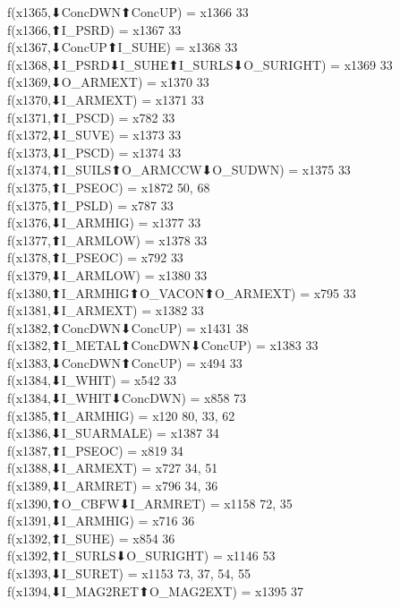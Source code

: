 f(x1365,⬇ConcDWN⬆ConcUP) = x1366 {33} \\
f(x1366,⬆I_PSRD) = x1367 {33} \\
f(x1367,⬇ConcUP⬆I_SUHE) = x1368 {33} \\
f(x1368,⬇I_PSRD⬇I_SUHE⬆I_SURLS⬇O_SURIGHT) = x1369 {33} \\
f(x1369,⬇O_ARMEXT) = x1370 {33} \\
f(x1370,⬇I_ARMEXT) = x1371 {33} \\
f(x1371,⬆I_PSCD) = x782 {33} \\
f(x1372,⬇I_SUVE) = x1373 {33} \\
f(x1373,⬇I_PSCD) = x1374 {33} \\
f(x1374,⬆I_SUILS⬆O_ARMCCW⬇O_SUDWN) = x1375 {33} \\
f(x1375,⬆I_PSEOC) = x1872 {50, 68} \\
f(x1375,⬆I_PSLD) = x787 {33} \\
f(x1376,⬇I_ARMHIG) = x1377 {33} \\
f(x1377,⬆I_ARMLOW) = x1378 {33} \\
f(x1378,⬆I_PSEOC) = x792 {33} \\
f(x1379,⬇I_ARMLOW) = x1380 {33} \\
f(x1380,⬆I_ARMHIG⬆O_VACON⬆O_ARMEXT) = x795 {33} \\
f(x1381,⬇I_ARMEXT) = x1382 {33} \\
f(x1382,⬆ConcDWN⬇ConcUP) = x1431 {38} \\
f(x1382,⬆I_METAL⬆ConcDWN⬇ConcUP) = x1383 {33} \\
f(x1383,⬇ConcDWN⬆ConcUP) = x494 {33} \\
f(x1384,⬇I_WHIT) = x542 {33} \\
f(x1384,⬇I_WHIT⬇ConcDWN) = x858 {73} \\
f(x1385,⬆I_ARMHIG) = x120 {80, 33, 62} \\
f(x1386,⬇I_SUARMALE) = x1387 {34} \\
f(x1387,⬆I_PSEOC) = x819 {34} \\
f(x1388,⬇I_ARMEXT) = x727 {34, 51} \\
f(x1389,⬇I_ARMRET) = x796 {34, 36} \\
f(x1390,⬆O_CBFW⬇I_ARMRET) = x1158 {72, 35} \\
f(x1391,⬇I_ARMHIG) = x716 {36} \\
f(x1392,⬆I_SUHE) = x854 {36} \\
f(x1392,⬆I_SURLS⬇O_SURIGHT) = x1146 {53} \\
f(x1393,⬇I_SURET) = x1153 {73, 37, 54, 55} \\
f(x1394,⬇I_MAG2RET⬆O_MAG2EXT) = x1395 {37} \\
